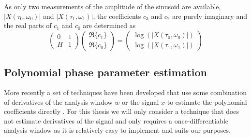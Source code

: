 As only two measurements of the amplitude of the sinusoid are available,
$|X(\tau_0,\omega_0)|$ and $|X(\tau_1,\omega_1)|$, the coefficients
$c_3$ and $c_2$ are purely imaginary and the real parts of $c_1$ and $c_0$ are
determined as
\begin{equation}
    \begin{pmatrix}
        0 & 1 \\
        H & 1
    \end{pmatrix}
    \begin{pmatrix}
        \Re\{c_1\} \\
        \Re\{c_0\}
    \end{pmatrix}
    =
    \begin{pmatrix}
        \log(|X(\tau_0,\omega_0)|) \\
        \log(|X(\tau_1,\omega_1)|)
    \end{pmatrix}
\end{equation}

\subsection{Polynomial phase parameter estimation}
\label{sec:ddm_description}
More recently a set of techniques have been developed that use some combination
of derivatives of the analysis window $w$ or the signal $x$ to estimate the
polynomial coefficients directly \cite{hamilton2011non}. For this thesis we will
only consider a technique that does not estimate derivatives of the signal and
only requires a once-differentiable analysis window as it is relatively easy to
implement and suits our purposes.

